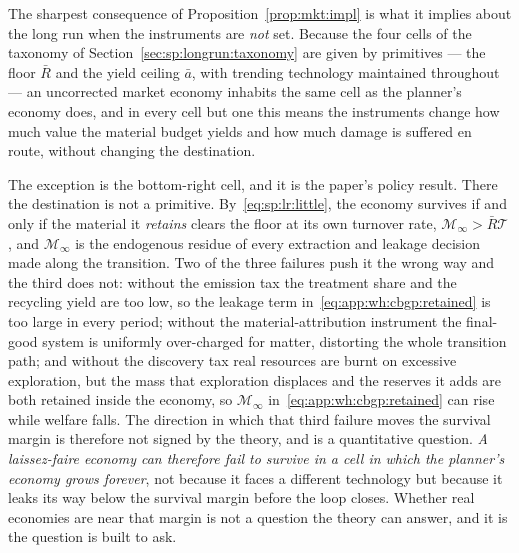 The sharpest consequence of Proposition~\ref{prop:mkt:impl} is what it implies about the long run when the instruments are \emph{not} set. Because the four cells of the taxonomy of Section~\ref{sec:sp:longrun:taxonomy} are given by primitives --- the floor $\bar R$ and the yield ceiling $\bar a$, with trending technology maintained throughout --- an uncorrected market economy inhabits the same cell as the planner's economy does, and in every cell but one this means the instruments change how much value the material budget yields and how much damage is suffered en route, without changing the destination.

The exception is the bottom-right cell, and it is the paper's policy result. There the destination is not a primitive. By~\eqref{eq:sp:lr:little}, the economy survives if and only if the material it \emph{retains} clears the floor at its own turnover rate, $\mathcal M_\infty>\bar R\mathcal T$, and $\mathcal M_\infty$ is the endogenous residue of every extraction and leakage decision made along the transition. Two of the three failures push it the wrong way and the third does not: without the emission tax the treatment share and the recycling yield are too low, so the leakage term in~\eqref{eq:app:wh:cbgp:retained} is too large in every period; without the material-attribution instrument the final-good system is uniformly over-charged for matter, distorting the whole transition path; and without the discovery tax real resources are burnt on excessive exploration, but the mass that exploration displaces and the reserves it adds are both retained inside the economy, so $\mathcal M_\infty$ in~\eqref{eq:app:wh:cbgp:retained} can rise while welfare falls. The direction in which that third failure moves the survival margin is therefore not signed by the theory, and is a quantitative question. \emph{A laissez-faire economy can therefore fail to survive in a cell in which the planner's economy grows forever}, not because it faces a different technology but because it leaks its way below the survival margin before the loop closes. Whether real economies are near that margin is not a question the theory can answer, and it is the question \quantnote{} is built to ask.
